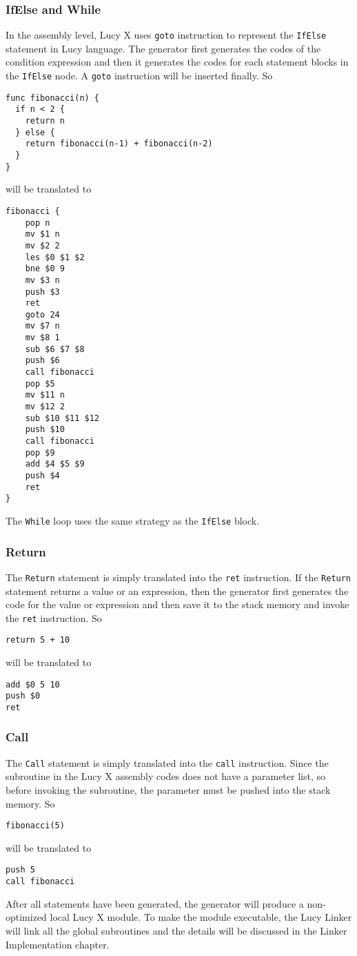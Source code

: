 \subsubsection{IfElse and While}
In the assembly level, Lucy X uses \texttt{goto} instruction to represent the \texttt{IfElse} statement in Lucy language. The generator first generates the codes of the condition expression and then it generates the codes for each statement blocks in the \texttt{IfElse} node. A \texttt{goto} instruction will be inserted finally. So
\begin{lstlisting}
func fibonacci(n) {
  if n < 2 {
    return n
  } else {
    return fibonacci(n-1) + fibonacci(n-2)
  }
}
\end{lstlisting}
will be translated to
\begin{lstlisting}[language=LucyX]
fibonacci {
	pop n
	mv $1 n
	mv $2 2
	les $0 $1 $2
	bne $0 9
	mv $3 n
	push $3
	ret
	goto 24
	mv $7 n
	mv $8 1
	sub $6 $7 $8
	push $6
	call fibonacci
	pop $5
	mv $11 n
	mv $12 2
	sub $10 $11 $12
	push $10
	call fibonacci
	pop $9
	add $4 $5 $9
	push $4
	ret
}
\end{lstlisting}
The \texttt{While} loop uses the same strategy as the \texttt{IfElse} block.
\subsubsection{Return}
The \texttt{Return} statement is simply translated into the \texttt{ret} instruction. If the \texttt{Return} statement returns a value or an expression, then the generator first generates the code for the value or expression and then save it to the stack memory and invoke the \texttt{ret} instruction. So
\begin{lstlisting}
return 5 + 10
\end{lstlisting}
will be translated to
\begin{lstlisting}[language=LucyX]
add $0 5 10
push $0
ret
\end{lstlisting}
\subsubsection{Call}
The \texttt{Call} statement is simply translated into the \texttt{call} instruction. Since the subroutine in the Lucy X assembly codes does not have a parameter list, so before invoking the subroutine, the parameter must be pushed into the stack memory. So
\begin{lstlisting}
fibonacci(5)
\end{lstlisting}
will be translated to
\begin{lstlisting}[language=LucyX]
push 5
call fibonacci
\end{lstlisting}
After all statements have been generated, the generator will produce a non-optimized local Lucy X module. To make the module executable, the Lucy Linker will link all the global subroutines and the details will be discussed in the Linker Implementation chapter.

